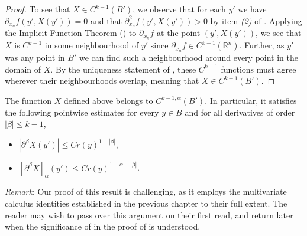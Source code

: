 \documentclass[oneside,hidelinks,indentfirst,10pt]{book}
\begin{document}
\begin{proof}
To see that \(X\in C^{k-1}(B')\), we observe that for each \(y'\) we have \(\partial_{x_n}f(y',X(y'))=0\) and that \(\partial^2_{x_n}f(y',X(y'))>0\) by item \textit{(2)} of . Applying the Implicit Function Theorem () to \(\partial_{x_n}f\) at the point \((y',X(y'))\), we see that \(X\) is \(C^{k-1}\) in some neighbourhood of \(y'\) since \(\partial_{x_n}f\in C^{k-1}(\mathbb{R}^n)\). Further, as \(y'\) was any point in \(B'\) we can find such a neighbourhood around every point in the domain of \(X\). By the uniqueness statement of , these \(C^{k-1}\) functions must agree wherever their neighbourhoods overlap, meaning that \(X\in C^{k-1}(B')\).
\end{proof}


\begin{lem}\label{lem:minia2}
The function \(X\) defined above belongs to \(C^{k-1,\alpha}(B')\). In particular, it satisfies the following pointwise estimates for every \(y\in B\) and for all derivatives of order \(|\beta|\leq k-1\),
\begin{itemize}
    \item[(1)] \(|\partial^\beta X(y')|\leq Cr(y)^{1-|\beta|}\),
    \item[(2)] \([\partial^\beta X]_{\alpha}(y')\leq Cr(y)^{1-\alpha-|\beta|}\).
\end{itemize}
\end{lem}

\textit{Remark}: Our proof of this result is challenging, as it employs the multivariate calculus identities established in the previous chapter to their full extent. The reader may wish to pass over this argument on their first read, and return later when the significance of  in the proof of  is understood.
\end{document}
